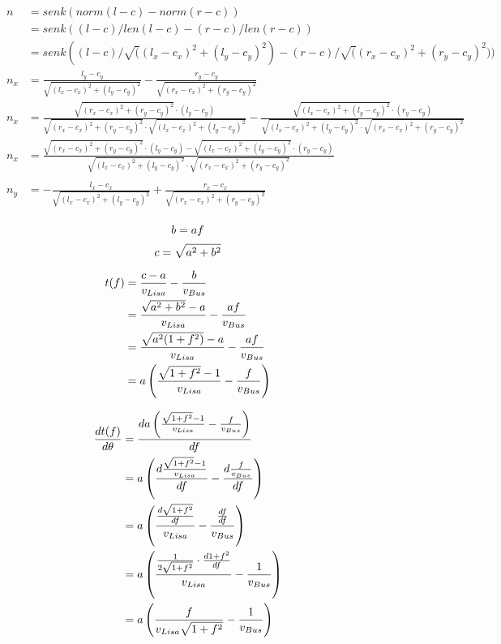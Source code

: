 \documentclass[10pt]{article}
\begin{document}
\begin{align*}
&&n &= senk(norm(l-c)-norm(r-c)) \\
&&  &= senk((l-c)/len(l-c)-(r-c)/len(r-c)) \\
&&  &= senk((l-c)/\sqrt((l_x-c_x)^2+(l_y-c_y)^2)-(r-c)/\sqrt((r_x-c_x)^2+(r_y-c_y)^2)) \\
&&n_x &=  \frac{l_y-c_y}{\sqrt{(l_x-c_x)^2+(l_y-c_y)^2}}
        - \frac{r_y-c_y}{\sqrt{(r_x-c_x)^2+(r_y-c_y)^2}} \\
&&n_x &=  \frac{\sqrt{(r_x-c_x)^2+(r_y-c_y)^2}\cdot(l_y-c_y)}{\sqrt{(r_x-c_x)^2+(r_y-c_y)^2}\cdot\sqrt{(l_x-c_x)^2+(l_y-c_y)^2}}
        - \frac{\sqrt{(l_x-c_x)^2+(l_y-c_y)^2}\cdot(r_y-c_y)}{\sqrt{(l_x-c_x)^2+(l_y-c_y)^2}\cdot\sqrt{(r_x-c_x)^2+(r_y-c_y)^2}} \\
&&n_x &=  \frac{\sqrt{(r_x-c_x)^2+(r_y-c_y)^2}\cdot(l_y-c_y) - \sqrt{(l_x-c_x)^2+(l_y-c_y)^2}\cdot(r_y-c_y)}{\sqrt{(l_x-c_x)^2+(l_y-c_y)^2}\cdot\sqrt{(r_x-c_x)^2+(r_y-c_y)^2}} \\
&&&\\
&&n_y &= -\frac{l_x-c_x}{\sqrt{(l_x-c_x)^2+(l_y-c_y)^2}} 
        + \frac{r_x-c_x}{\sqrt{(r_x-c_x)^2+(r_y-c_y)^2}} \\
\end{align*}

\newpage

\[b=af\]
\[c=\sqrt{a^2+b^2}\]

\begin{align*}
t(f) &= \frac{c-a}{v_{Lisa}} - \frac{b}{v_{Bus}}\\
&= \frac{\sqrt{a^2+b^2}-a}{v_{Lisa}} - \frac{af}{v_{Bus}}\\
&= \frac{\sqrt{a^2(1+f^2)}-a}{v_{Lisa}} - \frac{af}{v_{Bus}}\\
&= a\left(\frac{\sqrt{1+f^2}-1}{v_{Lisa}} - \frac{f}{v_{Bus}}\right)\\
\end{align*}

\begin{align*}
\frac{dt(f)}{d\theta} &= \frac{da\left(\frac{\sqrt{1+f^2}-1}{v_{Lisa}} - \frac{f}{v_{Bus}}\right)}{df}\\
&= a\left(\frac{d\frac{\sqrt{1+f^2}-1}{v_{Lisa}}}{df} - \frac{d\frac{f}{v_{Bus}}}{df}\right)\\
&= a\left(\frac{\frac{d\sqrt{1+f^2}}{df}}{v_{Lisa}} - \frac{\frac{df}{df}}{v_{Bus}}\right)\\
&= a\left(\frac{\frac{1}{2\sqrt{1+f^2}}\cdot\frac{d1+f^2}{df}}{v_{Lisa}} - \frac{1}{v_{Bus}}\right)\\
&= a\left(\frac{f}{v_{Lisa}\sqrt{1+f^2}} - \frac{1}{v_{Bus}}\right)\\
\end{align*}
\end{document}
